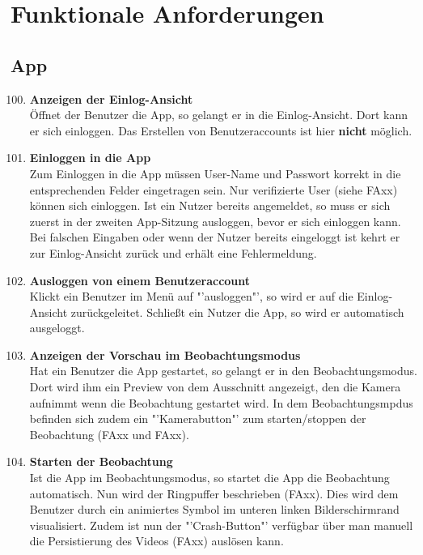 \chapter{Funktionale Anforderungen}

\section{App}
\begin{enumerate}[\bfseries{FA}10]
\setcounter{enumi}{99}
\item \textbf{Anzeigen der Einlog-Ansicht} \hfill \\
Öffnet der Benutzer die App, so gelangt er in die Einlog-Ansicht. Dort kann er sich einloggen. Das Erstellen von Benutzeraccounts ist hier \textbf{nicht} möglich.

\item \textbf{Einloggen in die App} \hfill \\
Zum Einloggen in die App müssen User-Name und Passwort korrekt in die entsprechenden Felder eingetragen sein. Nur verifizierte User (siehe FAxx) können sich einloggen. Ist ein Nutzer bereits angemeldet, so muss er sich zuerst in der zweiten App-Sitzung ausloggen, bevor er sich einloggen kann. Bei falschen Eingaben oder wenn der Nutzer bereits eingeloggt ist kehrt er zur Einlog-Ansicht zurück und erhält eine Fehlermeldung.

\item \textbf{Ausloggen von einem Benutzeraccount} \hfill \\
Klickt ein Benutzer im Menü auf "'ausloggen"', so wird er auf die Einlog-Ansicht zurückgeleitet. Schließt ein Nutzer die App, so wird er automatisch ausgeloggt.

\item \textbf{Anzeigen der Vorschau im Beobachtungsmodus} \hfill \\
Hat ein Benutzer die App gestartet, so gelangt er in den Beobachtungsmodus. Dort wird ihm ein Preview von dem Ausschnitt angezeigt, den die Kamera aufnimmt wenn die Beobachtung gestartet wird. In dem Beobachtungsmpdus befinden sich zudem ein "'Kamerabutton"' zum starten/stoppen der Beobachtung (FAxx und FAxx).

\item \textbf{Starten der Beobachtung} \hfill \\
Ist die App im Beobachtungsmodus, so startet die App die Beobachtung automatisch. Nun wird der Ringpuffer beschrieben (FAxx). Dies wird dem Benutzer durch ein animiertes Symbol im unteren linken Bilderschirmrand visualisiert. Zudem ist nun der "'Crash-Button"' verfügbar über man manuell die Persistierung des Videos (FAxx) auslösen kann.


\end{enumerate}
